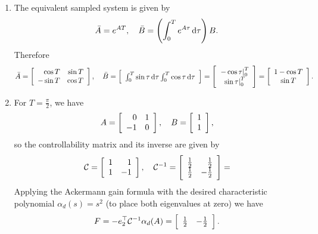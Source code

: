 \documentclass{article}
\begin{document}
\begin{enumerate}
\item{
  The equivalent sampled system is given by
  $$
  \bar{A} = e^{AT}, \quad
  \bar{B} = \left( \int_0^T e^{A \tau} \dif\tau \right) B.
  $$
  Therefore
  $$
  \bar{A} =
  \left[\begin{array}{r r}
    \cos T & \sin T \\
   -\sin T & \cos T
  \end{array}\right], \quad
  \bar{B} =
  \left[\begin{array}{c}
    \int_0^T \sin \tau \dif\tau
    \int_0^T \cos \tau \dif \tau
  \end{array}\right] =
  \left[\begin{array}{c}
    \left. -\cos \tau \right|_0^T \\
    \left. \sin \tau \right|_0^T
  \end{array}\right] =
  \left[\begin{array}{c}
    1 - \cos T \\
    \sin T
  \end{array}\right].
  $$
}
\item{
  For $T = \frac{\pi}{2}$, we have
  $$
  A =
  \left[\begin{array}{r r}
    0 &  1 \\
   -1 &  0
  \end{array}\right], \quad
  B =
  \left[\begin{array}{r}
    1 \\
    1
  \end{array}\right],
  $$
  so the controllability matrix and its inverse are given by
  $$
  \mathcal{C} =
  \left[\begin{array}{r r}
    1 &  1 \\
    1 & -1
  \end{array}\right], \quad
  \mathcal{C}^{-1} =
  \left[\begin{array}{r r}
    \frac{1}{2} &  \frac{1}{2} \\
    \frac{1}{2} & -\frac{1}{2}
  \end{array}\right] =
  $$
  Applying the Ackermann gain formula with the desired characteristic
  polynomial $\alpha_d(s) = s^2$ (to place both eigenvalues at zero)
  we have
  $$
  F = -e_2^\top \mathcal{C}^{-1} \alpha_d(A) =
  \left[\begin{array}{r r}
    \frac{1}{2} & -\frac{1}{2}
  \end{array}\right].
  $$

}
\end{enumerate}
\end{document}
